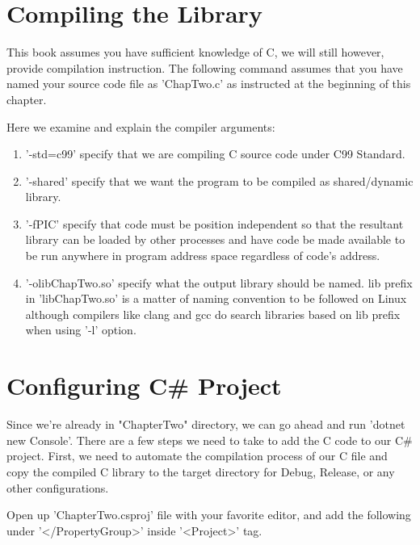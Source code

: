 

\section{Compiling the Library}
This book assumes you have sufficient knowledge of C, we will still however, provide compilation instruction. The following command assumes that you have named your source code file as 'ChapTwo.c' as instructed at the beginning of this chapter.



Here we examine and explain the compiler arguments:

\begin{enumerate}
	\item '-std=c99' specify that we are compiling C source code under C99 Standard.
	\item '-shared' specify that we want the program to be compiled as shared/dynamic library.
	\item '-fPIC' specify that code must be position independent so that the resultant library can be loaded by other processes and have code be made available to be run anywhere in program address space regardless of code's address.
	\item '-olibChapTwo.so' specify what the output library should be named. lib prefix in 'libChapTwo.so' is a matter of naming convention to be followed on Linux although compilers like clang and gcc do search libraries based on lib prefix when using '-l' option. 
\end{enumerate}
\newpage
\section{Configuring C\# Project}
Since we're already in "ChapterTwo" directory, we can go ahead and run 'dotnet new Console'. There are a few steps we need to take to add the C code to our C\# project. First, we need to automate the compilation process of our C file and copy the compiled C library to the target directory for Debug, Release, or any other configurations.

Open up 'ChapterTwo.csproj' file with your favorite editor, and add the following under '</PropertyGroup>' inside '<Project>' tag.



